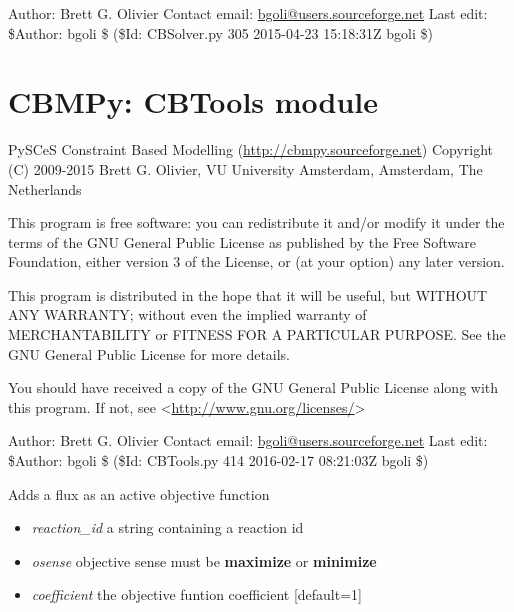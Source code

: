 \documentclass[a4paper,11pt,english]{sphinxmanual}
\begin{document}
Author: Brett G. Olivier
Contact email: \href{mailto:bgoli@users.sourceforge.net}{bgoli@users.sourceforge.net}
Last edit: \$Author: bgoli \$ (\$Id: CBSolver.py 305 2015-04-23 15:18:31Z bgoli \$)
\label{modules_doc:module-cbmpy.CBTools}

\section{CBMPy: CBTools module}
\label{modules_doc:cbmpy-cbtools-module}
PySCeS Constraint Based Modelling (\href{http://cbmpy.sourceforge.net}{http://cbmpy.sourceforge.net})
Copyright (C) 2009-2015 Brett G. Olivier, VU University Amsterdam, Amsterdam, The Netherlands

This program is free software: you can redistribute it and/or modify
it under the terms of the GNU General Public License as published by
the Free Software Foundation, either version 3 of the License, or
(at your option) any later version.

This program is distributed in the hope that it will be useful,
but WITHOUT ANY WARRANTY; without even the implied warranty of
MERCHANTABILITY or FITNESS FOR A PARTICULAR PURPOSE.  See the
GNU General Public License for more details.

You should have received a copy of the GNU General Public License
along with this program.  If not, see \textless{}\href{http://www.gnu.org/licenses/}{http://www.gnu.org/licenses/}\textgreater{}

Author: Brett G. Olivier
Contact email: \href{mailto:bgoli@users.sourceforge.net}{bgoli@users.sourceforge.net}
Last edit: \$Author: bgoli \$ (\$Id: CBTools.py 414 2016-02-17 08:21:03Z bgoli \$)

\begin{fulllineitems}
\label{modules_doc:cbmpy.CBTools.addFluxAsActiveObjective}
Adds a flux as an active objective function
\begin{itemize}
\item {} 
\emph{reaction\_id} a string containing a reaction id

\item {} 
\emph{osense} objective sense must be \textbf{maximize} or \textbf{minimize}

\item {} 
\emph{coefficient} the objective funtion coefficient {[}default=1{]}

\end{itemize}

\end{fulllineitems}
\end{document}
